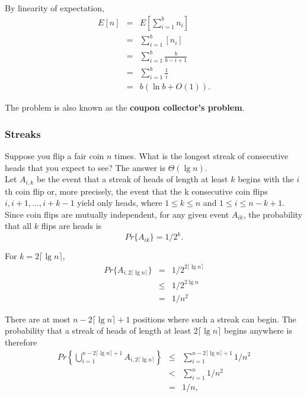 \documentclass[12pt]{article}
\begin{document}
By linearity of expectation,
\begin{eqnarray*}
  E[n]
  &=& E \left[ \sum_{i=1}^b n_i  \right] \\
  &=& \sum_{i=1}^b [n_i] \\
  &=& \sum_{i=1}^b \frac {b}{b-i+1} \\
  &=& \sum_{i=1}^b \frac {1}{i} \\
  &=& b( \ln b + O(1)).
\end{eqnarray*}

The problem is also known as the \textbf {coupon collector's problem}.

\subsubsection{Streaks}

Suppose you flip a fair coin $n$ times. What is the longest streak of consecutive heads that you expect to see? The answer is $\Theta (\lg n)$. \\

Let $A_{i,k}$ be the event that a streak of heads of length at least $k$ begins with the $i$th coin flip or, more precisely, the event that the k consecutive coin flips $i, i + 1, \dots, i + k -1$ yield only heads, where $1 \le k \le n$ and $1 \le i \le n - k + 1$. Since coin flips are mutually independent, for any given event $A_{ik}$, the probability that all $k$ flips are heads is
\begin{equation*}
  Pr \{ A_{ik} \} = 1 / 2^k.
\end{equation*}

For $k = 2 \lceil \lg n \rceil$,
\begin{eqnarray*}
  Pr \{ A_{i, 2 \lceil \lg n \rceil} \}
  &=& 1 / 2^{2 \lceil \lg n \rceil} \\
  &\le& 1 / 2^{2 \lg n} \\
  &=& 1 / n^2
\end{eqnarray*}

There are at most $n - 2 \lceil \lg n \rceil + 1$ positions where such a streak can begin. The probability that a streak of heads of length at least $2 \lceil \lg n \rceil$ begins anywhere is therefore
\begin{eqnarray*}
  Pr \left\{ \bigcup_{i=1}^{n - 2 \lceil \lg n \rceil + 1} A_{i,2 \lceil \lg n \rceil} \right\}
  &\le&  \sum_{i=1}^{n - 2 \lceil \lg n \rceil + 1} 1 / n^2 \\
  &<& \sum_{i=1}^n 1 / n^2 \\
  &=& 1/n,
\end{eqnarray*}
\end{document}
